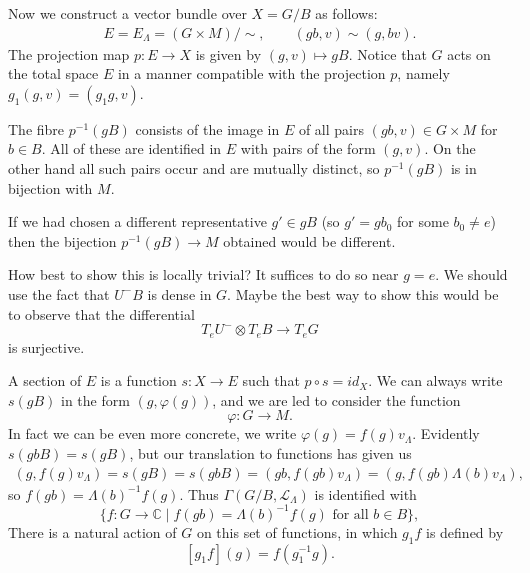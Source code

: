 \documentclass[12pt]{article}
\theoremstyle{plain}
\theoremstyle{definition}
\numberwithin{equation}{section}
\newcommand{\La}{\Lambda}
\newcommand{\C}{\mathbb{C}}
\newcommand{\CL}{\mathcal{L}}
\begin{document}
%
%


Now we construct a vector bundle over $X = G / B$ as follows:
\begin{align*}
E = E_\La = (G \times M)/\sim, \qquad (g b, v) \sim (g, b v).
\end{align*}
The projection map $p : E \rightarrow X$ is given by $(g, v) \mapsto gB$. Notice that $G$ acts on the total space $E$ in a manner compatible with the projection $p$, namely $g_1(g, v) = (g_1g, v)$.

The fibre $p^{-1}(gB)$ consists of the image in $E$ of all pairs $(gb, v) \in G \times M$ for $b \in B$. All of these are identified in $E$ with pairs of the form $(g, v)$. On the other hand all such pairs occur and are mutually distinct, so $p^{-1}(gB)$ is in bijection with $M$.

If we had chosen a different representative $g' \in gB$ (so $g' = gb_0$ for some $b_0 \neq e$) then the bijection $p^{-1}(gB) \rightarrow M$ obtained would be different.



{\color{red}
How best to show this is locally trivial? It suffices to do so near $g = e$. We should use the fact that $U^- B$ is dense in $G$. Maybe the best way to show this would be to observe that the differential
\[
T_e U^- \otimes T_e B \rightarrow T_e G
\]
is surjective.
}

A section of $E$ is a function $s : X \rightarrow E$ such that $p \circ s = id_X$. We can always write $s(gB)$ in the form $(g, \varphi(g))$, and we are led to consider the function
\[
\varphi : G \rightarrow M.
\]
In fact we can be even more concrete, we write $\varphi(g) = f(g)v_\La$. Evidently $s(gbB) = s(gB)$, but our translation to functions has given us
\begin{align*}
(g, f(g) v_\La) = s(gB) = s(gbB) = (gb, f(gb) v_\La) = (g, f(gb) \La(b) v_\La),
\end{align*}
so $f(gb) = \Lambda(b)^{-1} f(g)$. Thus $\Gamma(G/B, \CL_\Lambda)$ is identified with
\[
\{f : G \rightarrow \C \mid \text{$f(gb) = \Lambda(b)^{-1} f(g)$ for all $b \in B$}\},
\]
There is a natural action of $G$ on this set of functions, in which $g_1f$ is defined by
\[
[g_1f](g) = f(g_1^{-1}g).
\]
\end{document}
